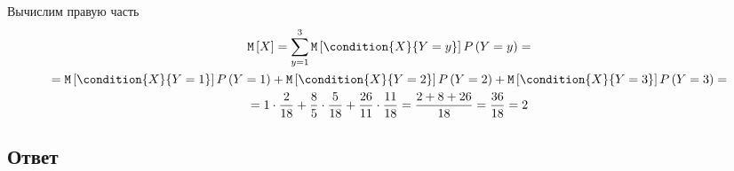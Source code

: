 \documentclass[12pt,a4paper]{article}
\begin{document}
\begin{enumerate}
        Вычислим правую часть
        \begin{multline}
            \expectation{X}
            = \sum_{y=1}^3 \expectation{\condition{X}{Y=y}} \probability{Y=y} = \\
            = \expectation{\condition{X}{Y=1}} \probability{Y=1} + \expectation{\condition{X}{Y=2}} \probability{Y=2} + \expectation{\condition{X}{Y=3}} \probability{Y=3} = \\
            = 1 \cdot \frac{2}{18} + \frac{8}{5} \cdot \frac{5}{18}  + \frac{26}{11} \cdot \frac{11}{18}
            = \frac{2 + 8 + 26}{18}
            = \frac{36}{18}
            = 2
        \end{multline}
    \end{enumerate}

    \subsection*{Ответ}
\end{document}

